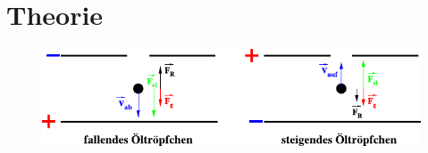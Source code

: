 \section{Theorie}
\label{sec:theorie}

\begin{figure}[H]
	\centering
	\includegraphics[width=0.75\linewidth]{content/grafik/gleichgewicht.pdf}
	\caption{}
	\label{fig:gleichgewicht}
\end{figure}

